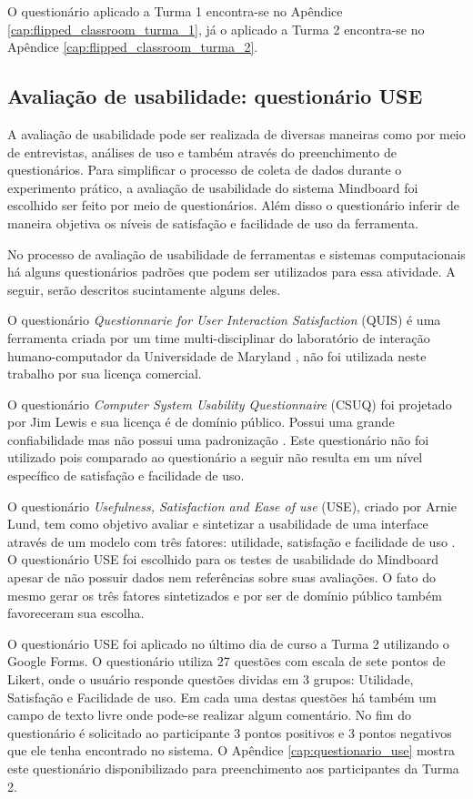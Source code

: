 O questionário aplicado a Turma 1 encontra-se no Apêndice \ref{cap:flipped_classroom_turma_1}, já o aplicado a Turma 2 encontra-se no Apêndice \ref{cap:flipped_classroom_turma_2}.

\subsection{Avaliação de usabilidade: questionário USE}

A avaliação de usabilidade pode ser realizada de diversas maneiras como por meio de entrevistas, análises de uso e também através do preenchimento de questionários. Para simplificar o processo de coleta de dados durante o experimento prático, a avaliação de usabilidade do sistema Mindboard foi escolhido ser feito por meio de questionários. Além disso o questionário inferir de maneira objetiva os níveis de satisfação e facilidade de uso da ferramenta.

No processo de avaliação de usabilidade de ferramentas e sistemas computacionais há alguns questionários padrões que podem ser utilizados para essa atividade. A seguir, serão descritos sucintamente alguns deles. 

O questionário \emph{Questionnarie for User Interaction Satisfaction} (QUIS) é uma ferramenta criada por um time multi-disciplinar do laboratório de interação humano-computador da Universidade de Maryland \cite{quis}, não foi utilizada neste trabalho por sua licença comercial.

O questionário \emph{Computer System Usability Questionnaire} (CSUQ) foi projetado por Jim Lewis e sua licença é de domínio público. Possui uma grande confiabilidade mas não possui uma padronização \cite{csuq}. Este questionário não foi utilizado pois comparado ao questionário a seguir não resulta em um nível específico de satisfação e facilidade de uso.

O questionário \emph{Usefulness, Satisfaction and Ease of use} (USE), criado por Arnie Lund, tem como objetivo avaliar e sintetizar a usabilidade de uma interface através de um modelo com três fatores: utilidade, satisfação e facilidade de uso \cite{useq}. O questionário USE foi escolhido para os testes de usabilidade do Mindboard apesar de não possuir dados nem referências sobre suas avaliações. O fato do mesmo gerar os três fatores sintetizados e por ser de domínio público também favoreceram sua escolha.

O questionário USE foi aplicado no último dia de curso a Turma 2 utilizando o Google Forms. O questionário utiliza 27 questões com escala de sete pontos de Likert, onde o usuário responde questões dividas em 3 grupos: Utilidade, Satisfação e Facilidade de uso. Em cada uma destas questões há também um campo de texto livre onde pode-se realizar algum comentário. No fim do questionário é solicitado ao participante 3 pontos positivos e 3 pontos negativos que ele tenha encontrado no sistema. O Apêndice \ref{cap:questionario_use} mostra este questionário disponibilizado para preenchimento aos participantes da Turma 2.

